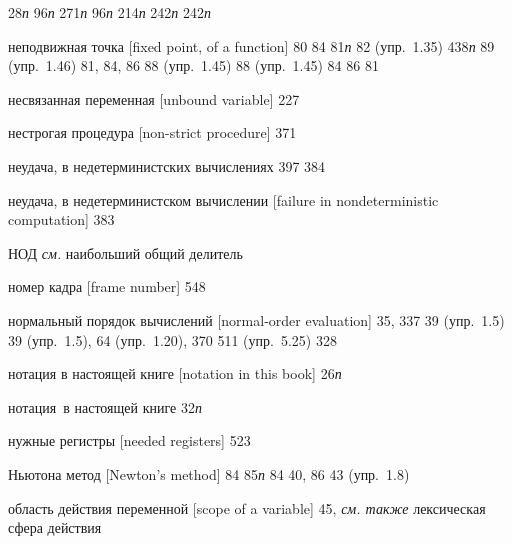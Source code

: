 \begin{theindex}
   28{\it п}
   96{\it п}
   271{\it п}
   96{\it п}
   214{\it п}
   242{\it п}
   242{\it п}
\item {неподвижная точка [fixed point, of a function]} 80
   84
   81{\it п}
   82 (упр.~1.35)
   438{\it п}
   89 (упр.~1.46)
   81, 84, 86
   88 (упр.~1.45)
   88 (упр.~1.45)
   84
   86
   81
\item {несвязанная переменная [unbound variable]} 227
\item {нестрогая процедура [non-strict procedure]} 371
\item {неудача, в недетерминистских вычислениях}
   397
   384
\item {неудача, в недетерминистском вычислении [fai\-lure in non\-de\-ter\-mi\-nis\-tic com\-pu\-ta\-tion]} 383
\item {НОД} {\it см.} наибольший общий делитель
\item {номер кадра [frame number]} 548
\item {нормальный порядок вычислений [normal-order evaluation]} 35, 337
   39 (упр.~1.5)
   39 (упр.~1.5), 64 (упр.~1.20), 370
   511 (упр.~5.25)
   328
\item {нотация в настоящей книге [notation in this book]}
   26{\it п}
\item {нотация~в настоящей книге}
   32{\it п}
\item {нужные регистры [needed registers]} 523
\item {Ньютона метод [Newton's method]} 84
   85{\it п}
   84
   40, 86
   43 (упр.~1.8)
\bigskip
\item {область действия переменной [scope of a variable]} 45, {\it см. также} лексическая сфера действия

\end{theindex}
